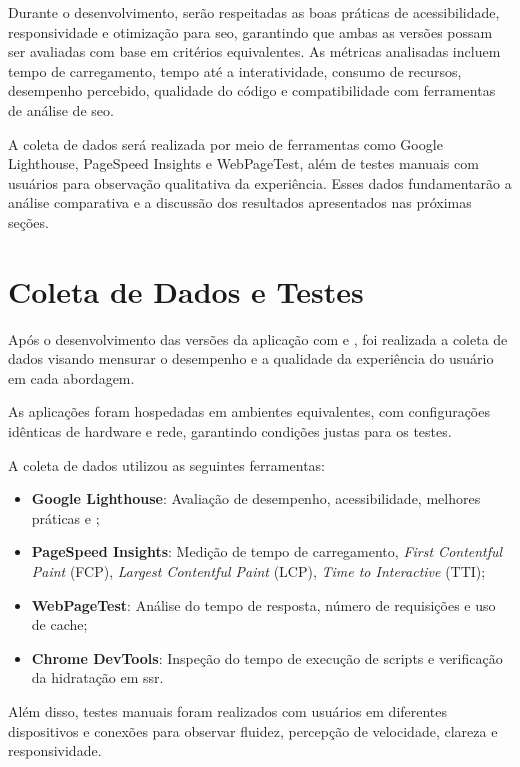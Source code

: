 Durante o desenvolvimento, serão respeitadas as boas práticas de acessibilidade, responsividade e otimização para \acrshort{seo}, garantindo que ambas as versões possam ser avaliadas com base em critérios equivalentes. As métricas analisadas incluem tempo de carregamento, tempo até a interatividade, consumo de recursos, desempenho percebido, qualidade do código e compatibilidade com ferramentas de análise de \acrshort{seo}.

A coleta de dados será realizada por meio de ferramentas como Google Lighthouse, PageSpeed Insights e WebPageTest, além de testes manuais com usuários para observação qualitativa da experiência. Esses dados fundamentarão a análise comparativa e a discussão dos resultados apresentados nas próximas seções.


\section{Coleta de Dados e Testes}
\label{sec:coleta-de-dados-e-testes}

Após o desenvolvimento das versões da aplicação com  e , foi realizada a coleta de dados visando mensurar o desempenho e a qualidade da experiência do usuário em cada abordagem.

As aplicações foram hospedadas em ambientes equivalentes, com configurações idênticas de hardware e rede, garantindo condições justas para os testes.

A coleta de dados utilizou as seguintes ferramentas:

\begin{itemize}
    \item \textbf{Google Lighthouse}: Avaliação de desempenho, acessibilidade, melhores práticas e ;
    \item \textbf{PageSpeed Insights}: Medição de tempo de carregamento, \textit{First Contentful Paint} (FCP), \textit{Largest Contentful Paint} (LCP), \textit{Time to Interactive} (TTI);
    \item \textbf{WebPageTest}: Análise do tempo de resposta, número de requisições e uso de cache;
    \item \textbf{Chrome DevTools}: Inspeção do tempo de execução de scripts e verificação da hidratação em \acrshort{ssr}.
\end{itemize}

Além disso, testes manuais foram realizados com usuários em diferentes dispositivos e conexões para observar fluidez, percepção de velocidade, clareza e responsividade.

